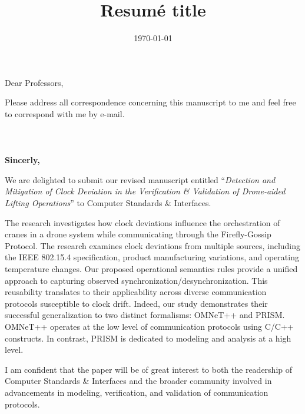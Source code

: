 \documentclass[11pt,a4paper,roman]{moderncv}        %
\title{Resumé title}                               %
\begin{document}

\date{\today}
\opening{Dear Professors,}
\closing{Please address all correspondence concerning this manuscript to me and feel free to correspond with me by e-mail.\\\\\\\\\vspace*{1 cm}\textbf{Sincerly,}}
\makelettertitle
 \justify
 
We are delighted to submit our revised manuscript entitled ``\emph{Detection and Mitigation of Clock Deviation in the Verification \& Validation of Drone-aided Lifting Operations}'' to Computer Standards \& Interfaces. 

The research investigates how clock deviations influence the orchestration of cranes in a drone system while communicating through the Firefly-Gossip Protocol. The research examines clock deviations from multiple sources, including the IEEE 802.15.4 specification, product manufacturing variations, and operating temperature changes. Our proposed operational semantics rules provide a unified approach to capturing observed synchronization/desynchronization. This reusability translates to their applicability across diverse communication protocols susceptible to clock drift. Indeed, our study demonstrates their successful generalization to two distinct formalisms: OMNeT++ and PRISM. OMNeT++ operates at the low level of communication protocols using C/C++ constructs. In contrast, PRISM is dedicated to modeling and analysis at a high level.

I am confident that the paper will be of great interest to both the readership of Computer Standards \& Interfaces and the broader community involved in advancements in modeling, verification, and validation of communication protocols.




\vspace{0.5cm}


\makeletterclosing
\end{document}
